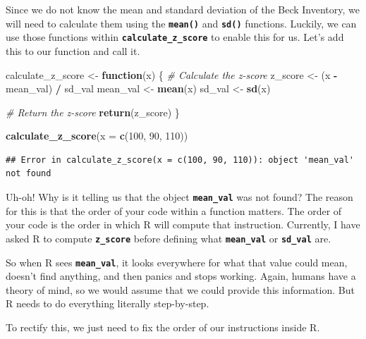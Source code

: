 \documentclass[
]{book}
\newenvironment{Shaded}{\begin{snugshade}}{\end{snugshade}}
\newcommand{\AttributeTok}[1]{\textcolor[rgb]{0.13,0.29,0.53}{#1}}
\newcommand{\CommentTok}[1]{\textcolor[rgb]{0.56,0.35,0.01}{\textit{#1}}}
\newcommand{\ControlFlowTok}[1]{\textcolor[rgb]{0.13,0.29,0.53}{\textbf{#1}}}
\newcommand{\DecValTok}[1]{\textcolor[rgb]{0.00,0.00,0.81}{#1}}
\newcommand{\FunctionTok}[1]{\textcolor[rgb]{0.13,0.29,0.53}{\textbf{#1}}}
\newcommand{\NormalTok}[1]{#1}
\newcommand{\OtherTok}[1]{\textcolor[rgb]{0.56,0.35,0.01}{#1}}
\newcommand{\SpecialCharTok}[1]{\textcolor[rgb]{0.81,0.36,0.00}{\textbf{#1}}}
\begin{document}
Since we do not know the mean and standard deviation of the Beck Inventory, we will need to calculate them using the \textbf{\texttt{mean()}} and \textbf{\texttt{sd()}} functions. Luckily, we can use those functions within \textbf{\texttt{calculate\_z\_score}} to enable this for us. Let's add this to our function and call it.

\begin{Shaded}
\begin{Highlighting}[]
\NormalTok{calculate\_z\_score }\OtherTok{\textless{}{-}} \ControlFlowTok{function}\NormalTok{(x) \{}
  \CommentTok{\# Calculate the z{-}score}
\NormalTok{  z\_score }\OtherTok{\textless{}{-}}\NormalTok{ (x }\SpecialCharTok{{-}}\NormalTok{ mean\_val) }\SpecialCharTok{/}\NormalTok{ sd\_val}
\NormalTok{  mean\_val }\OtherTok{\textless{}{-}} \FunctionTok{mean}\NormalTok{(x)}
\NormalTok{  sd\_val }\OtherTok{\textless{}{-}} \FunctionTok{sd}\NormalTok{(x)}
  
  \CommentTok{\# Return the z{-}score}
  \FunctionTok{return}\NormalTok{(z\_score)}
\NormalTok{\}}

\FunctionTok{calculate\_z\_score}\NormalTok{(}\AttributeTok{x =} \FunctionTok{c}\NormalTok{(}\DecValTok{100}\NormalTok{, }\DecValTok{90}\NormalTok{, }\DecValTok{110}\NormalTok{))}
\end{Highlighting}
\end{Shaded}

\begin{verbatim}
## Error in calculate_z_score(x = c(100, 90, 110)): object 'mean_val' not found
\end{verbatim}

Uh-oh! Why is it telling us that the object \textbf{\texttt{mean\_val}} was not found? The reason for this is that the order of your code within a function matters. The order of your code is the order in which R will compute that instruction. Currently, I have asked R to compute \textbf{\texttt{z\_score}} before defining what \textbf{\texttt{mean\_val}} or \textbf{\texttt{sd\_val}} are.

So when R sees \textbf{\texttt{mean\_val}}, it looks everywhere for what that value could mean, doesn't find anything, and then panics and stops working. Again, humans have a theory of mind, so we would assume that we could provide this information. But R needs to do everything literally step-by-step.

To rectify this, we just need to fix the order of our instructions inside R.
\end{document}
